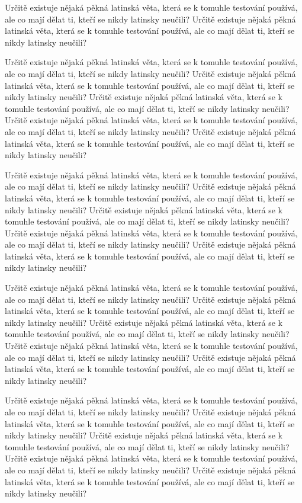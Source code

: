 \documentclass[11pt,twoside,a4paper]{book}
\begin{document}
Určitě existuje nějaká pěkná latinská věta, která se k tomuhle testování používá, ale co mají dělat ti, kteří se nikdy latinsky neučili? Určitě existuje nějaká pěkná latinská věta, která se k tomuhle testování používá, ale co mají dělat ti, kteří se nikdy latinsky neučili?

Určitě existuje nějaká pěkná latinská věta, která se k tomuhle testování používá, ale co mají dělat ti, kteří se nikdy latinsky neučili? Určitě existuje nějaká pěkná latinská věta, která se k tomuhle testování používá, ale co mají dělat ti, kteří se nikdy latinsky neučili? Určitě existuje nějaká pěkná latinská věta, která se k tomuhle testování používá, ale co mají dělat ti, kteří se nikdy latinsky neučili? Určitě existuje nějaká pěkná latinská věta, která se k tomuhle testování používá, ale co mají dělat ti, kteří se nikdy latinsky neučili? Určitě existuje nějaká pěkná latinská věta, která se k tomuhle testování používá, ale co mají dělat ti, kteří se nikdy latinsky neučili?

Určitě existuje nějaká pěkná latinská věta, která se k tomuhle testování používá, ale co mají dělat ti, kteří se nikdy latinsky neučili? Určitě existuje nějaká pěkná latinská věta, která se k tomuhle testování používá, ale co mají dělat ti, kteří se nikdy latinsky neučili? Určitě existuje nějaká pěkná latinská věta, která se k tomuhle testování používá, ale co mají dělat ti, kteří se nikdy latinsky neučili? Určitě existuje nějaká pěkná latinská věta, která se k tomuhle testování používá, ale co mají dělat ti, kteří se nikdy latinsky neučili? Určitě existuje nějaká pěkná latinská věta, která se k tomuhle testování používá, ale co mají dělat ti, kteří se nikdy latinsky neučili?

Určitě existuje nějaká pěkná latinská věta, která se k tomuhle testování používá, ale co mají dělat ti, kteří se nikdy latinsky neučili? Určitě existuje nějaká pěkná latinská věta, která se k tomuhle testování používá, ale co mají dělat ti, kteří se nikdy latinsky neučili? Určitě existuje nějaká pěkná latinská věta, která se k tomuhle testování používá, ale co mají dělat ti, kteří se nikdy latinsky neučili? Určitě existuje nějaká pěkná latinská věta, která se k tomuhle testování používá, ale co mají dělat ti, kteří se nikdy latinsky neučili? Určitě existuje nějaká pěkná latinská věta, která se k tomuhle testování používá, ale co mají dělat ti, kteří se nikdy latinsky neučili?

Určitě existuje nějaká pěkná latinská věta, která se k tomuhle testování používá, ale co mají dělat ti, kteří se nikdy latinsky neučili? Určitě existuje nějaká pěkná latinská věta, která se k tomuhle testování používá, ale co mají dělat ti, kteří se nikdy latinsky neučili? Určitě existuje nějaká pěkná latinská věta, která se k tomuhle testování používá, ale co mají dělat ti, kteří se nikdy latinsky neučili? Určitě existuje nějaká pěkná latinská věta, která se k tomuhle testování používá, ale co mají dělat ti, kteří se nikdy latinsky neučili? Určitě existuje nějaká pěkná latinská věta, která se k tomuhle testování používá, ale co mají dělat ti, kteří se nikdy latinsky neučili?
\end{document}
